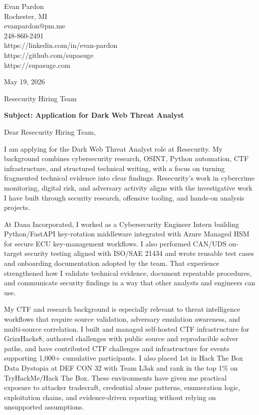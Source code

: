 \documentclass[letterpaper,11pt]{article}
\begin{document}
\begin{flushleft}
Evan Pardon \\Rochester, MI \\evanpardon@pm.me \\248-860-2491 \\https://linkedin.com/in/evan-pardon \\https://github.com/supasuge \\https://supasuge.com
\end{flushleft}

\vspace{0.35cm}

May 19, 2026

\vspace{0.35cm}

\begin{flushleft}
Resecurity Hiring Team
\end{flushleft}

\vspace{0.35cm}

\textbf{Subject: Application for Dark Web Threat Analyst}

\vspace{0.35cm}

Dear Resecurity Hiring Team,

I am applying for the Dark Web Threat Analyst role at Resecurity. My background combines cybersecurity research, OSINT, Python automation, CTF infrastructure, and structured technical writing, with a focus on turning fragmented technical evidence into clear findings. Resecurity’s work in cybercrime monitoring, digital risk, and adversary activity aligns with the investigative work I have built through security research, offensive tooling, and hands-on analysis projects.

At Dana Incorporated, I worked as a Cybersecurity Engineer Intern building Python/FastAPI key-rotation middleware integrated with Azure Managed HSM for secure ECU key-management workflows. I also performed CAN/UDS on-target security testing aligned with ISO/SAE 21434 and wrote reusable test cases and onboarding documentation adopted by the team. That experience strengthened how I validate technical evidence, document repeatable procedures, and communicate security findings in a way that other analysts and engineers can use.

My CTF and research background is especially relevant to threat intelligence workflows that require source validation, adversary emulation awareness, and multi-source correlation. I built and managed self-hosted CTF infrastructure for GrizzHacks8, authored challenges with public source and reproducible solver paths, and have contributed CTF challenges and infrastructure for events supporting 1,000+ cumulative participants. I also placed 1st in Hack The Box Data Dystopia at DEF CON 32 with Team L3ak and rank in the top 1\% on TryHackMe/Hack The Box. These environments have given me practical exposure to attacker tradecraft, credential abuse patterns, enumeration logic, exploitation chains, and evidence-driven reporting without relying on unsupported assumptions.
\end{document}
